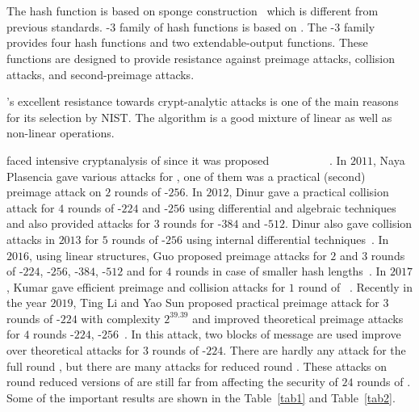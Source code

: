 \section{\mbox{\KECCAK{}}}

The \KECCAK{} hash function is based on sponge construction~\cite{bertoni2011cryptographic} which is different from previous \SHA{} standards. \SHA-$3$ family of hash functions is based on \Keccak{}. The \SHA-$3$ family provides four hash functions and two extendable-output functions. These functions are designed to provide resistance against preimage attacks, collision attacks, and second-preimage attacks.

\Keccak{}'s excellent resistance towards crypt-analytic attacks is one of the main reasons for its selection by NIST. The algorithm is a good mixture of linear as well as non-linear operations.

\KECCAK{} faced intensive cryptanalysis of \KECCAK{} since it was
proposed~\cite{bernstein2010second}~\cite{naya2011practical}~\cite{dinur2012new}
 \cite{dinur2013collision}~\cite{morawiecki2013sat}~\cite{dinur2014improved}~\cite{chang20141st}~\cite{guo2016linear}~\cite{qiao2017new}~\cite{song2017non}~\cite{kumar2018cryptanalysis}. 
In $2011$, Naya Plasencia \etal gave various attacks for \KECCAK{}, 
one of them was a practical (second) preimage attack on $2$ rounds of
 \KECCAK-$256$. In $2012$, Dinur \etal gave a practical collision attack for $4$ rounds of \KECCAK-$224$ and \KECCAK-$256$ using differential and algebraic techniques~\cite{dinur2012new} and also provided attacks for $3$ rounds for \KECCAK-$384$ and \KECCAK-$512$. Dinur \etal also gave collision attacks in $2013$ for $5$ rounds of \KECCAK-$256$ using internal differential techniques~\cite{dinur2013collision}. In $2016$, using linear structures, Guo \etal proposed preimage attacks for $2$ and $3$ rounds of \KECCAK-$224$, \KECCAK-$256$, \KECCAK-$384$, \KECCAK-$512$ and for $4$ rounds in case of smaller hash lengths~\cite{guo2016linear}. In $2017$, Kumar \etal gave efficient preimage and collision attacks for $1$ round of \KECCAK~\cite{kumar2018cryptanalysis}. Recently in the year $2019$, Ting Li and Yao Sun proposed practical preimage attack for $3$ rounds of \KECCAK-$224$ with complexity $2^{39.39}$ and improved theoretical preimage attacks for $4$ rounds \KECCAK-$224$, \KECCAK-$256$~\cite{lipreimage}. In this attack, two blocks of message are used improve over theoretical attacks for $3$ rounds of \KECCAK-$224$. There are hardly any attack for the full round \KECCAK{}, but there are many attacks for reduced round \Keccak{}. These attacks on round reduced versions of \KECCAK{} are still far from affecting the security of $24$ rounds of \KECCAK{}. Some of the important results are shown in the Table~\ref{tab1} and Table~\ref{tab2}.

